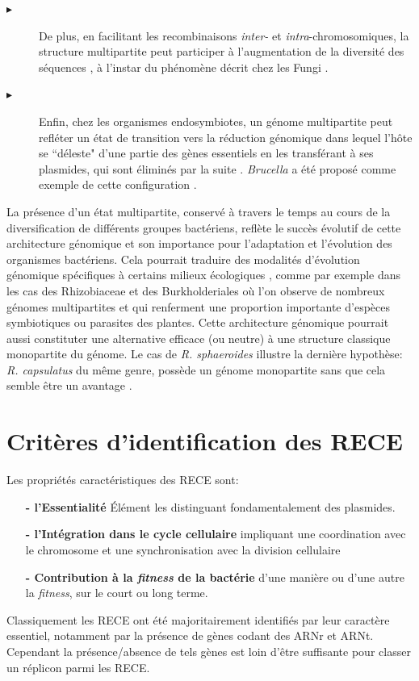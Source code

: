 \begin{description}
	\item[$\blacktriangleright$] De plus, en facilitant les recombinaisons \textit{inter-} et \textit{intra}-chromosomiques, la structure multipartite peut participer à l'augmentation de la diversité des séquences \citep{Mackenzie2004}, à l'instar du phénomène décrit chez les Fungi \citep{Croll2012}.
	\item[$\blacktriangleright$] Enfin, chez les organismes endosymbiotes, un génome multipartite peut refléter un état de transition vers la réduction génomique dans lequel l'hôte se ``déleste"  d'une partie des gènes essentiels en les transférant à ses plasmides, qui sont éliminés par la suite \citep{Moreno1998}. \textit{Brucella} a été proposé comme exemple de cette configuration \citep{Wattam2009}.
\end{description}	

	La présence d'un état multipartite, conservé à travers le temps au cours de la diversification de différents groupes bactériens, reflète le succès évolutif de cette architecture génomique et son importance pour l'adaptation et l'évolution des organismes bactériens. Cela pourrait traduire des modalités d'évolution génomique spécifiques à certains milieux écologiques \citep{Slater2009}, comme par exemple dans les cas des Rhizobiaceae et des Burkholderiales où l'on observe de nombreux génomes multipartites et qui renferment une proportion importante d'espèces symbiotiques ou parasites des plantes. Cette architecture génomique pourrait aussi constituter une alternative efficace (ou neutre) à une structure classique monopartite du génome. Le cas de \textit{R. sphaeroides} illustre la dernière hypothèse: \textit{R. capsulatus} du même genre, possède un génome monopartite sans que cela semble être un avantage \citep{tichi2001interactive,Choudhary2007}. 
      
   
\section{Critères d'identification des RECE}\label{chrIIrece}
	Les propriétés caractéristiques des RECE sont:
\begin{itemize}
	\item[\textbf{- l'Essentialité}] Élément les distinguant fondamentalement des plasmides.
	\item[\textbf{- l'Intégration dans le cycle cellulaire}] impliquant une coordination avec le chromosome et une synchronisation avec la division cellulaire
	\item[\textbf{- Contribution à la \textit{fitness} de la bactérie}] d'une manière ou d'une autre la \textit{fitness}, sur le court ou long terme.
\end{itemize}
	Classiquement les RECE ont été majoritairement identifiés par leur caractère essentiel, notamment par la présence de gènes codant des ARNr et ARNt. Cependant la présence/absence de tels gènes est loin d'être suffisante pour classer un réplicon parmi les RECE.
	
